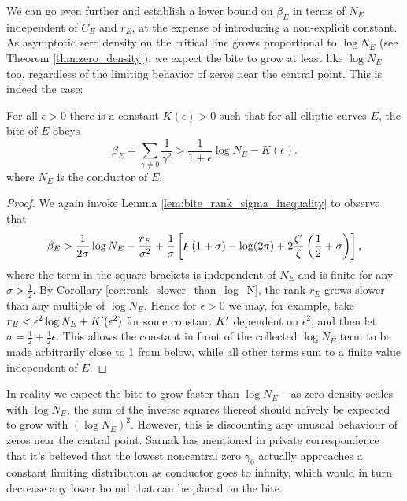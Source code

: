 We can go even further and establish a lower bound on $\beta_E$ in terms of $N_E$ independent of $C_E$ and $r_E$, at the expense of introducing a non-explicit constant. As asymptotic zero density on the critical line grows proportional to $\log N_E$ (see Theorem \ref{thm:zero_density}), we expect the bite to grow at least like $\log N_E$ too, regardless of the limiting behavior of zeros near the central point. This is indeed the case:
\begin{proposition}[GRH]
For all $\epsilon>0$ there is a constant $K(\epsilon)>0$ such that for all elliptic curves $E$, the bite of $E$ obeys
\begin{equation}\label{eqn:bite_lower_bound}
\beta_E = \sum_{\gamma\ne 0} \frac{1}{\gamma^2} > \frac{1}{1+\epsilon} \log N_E - K(\epsilon).
\end{equation}
where $N_E$ is the conductor of $E$.
\end{proposition}
\begin{proof}
We again invoke Lemma \ref{lem:bite_rank_sigma_inequality} to observe that
\begin{equation}
\beta_E > \frac{1}{2\sigma} \log N_E - \frac{r_E}{\sigma^2} + \frac{1}{\sigma}\left[\digamma(1+\sigma)-\log(2\pi) + 2\frac{\zeta^{\prime}}{\zeta}\left(\frac{1}{2}+\sigma\right)\right],
\end{equation}
where the term in the square brackets is independent of $N_E$ and is finite for any $\sigma>\frac{1}{2}$. By Corollary \ref{cor:rank_slower_than_log_N}, the rank $r_E$ grows slower than any multiple  of $\log N_E$. Hence for $\epsilon > 0$ we may, for example, take $r_E < \epsilon^2 \log N_E + K^{\prime}(\epsilon^2)$ for some constant $K^{\prime}$ dependent on $\epsilon^2$, and then let $\sigma = \frac{1}{2}+\frac{1}{2}\epsilon$. This allows the constant in front of the collected $\log N_E$ term to be made arbitrarily close to 1 from below, while all other terms sum to a finite value independent of $E$.
\end{proof}

In reality we expect the bite to grow faster than $\log N_E$ -- as zero density scales with $\log N_E$, the sum of the inverse squares thereof should na\"{i}vely be expected to grow with $(\log N_E)^2$. However, this is discounting any unusual behaviour of zeros near the central point. Sarnak has mentioned in private correspondence that it's believed that the lowest noncentral zero $\gamma_0$ actually approaches a constant limiting distribution as conductor goes to infinity, which would in turn decrease any lower bound that can be placed on the bite. \\


